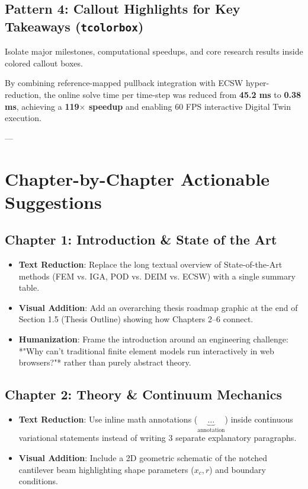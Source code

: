 \documentclass[12pt,a4paper]{article}
\begin{document}
\subsection{Pattern 4: Callout Highlights for Key Takeaways (\texttt{tcolorbox})}
Isolate major milestones, computational speedups, and core research results inside colored callout boxes.

\begin{tcolorbox}[colback=lightbg, colframe=accentcyan, title=\textbf{Key Result: Online Acceleration}, fonttitle=\bfseries]
By combining reference-mapped pullback integration with ECSW hyper-reduction, the online solve time per time-step was reduced from \textbf{45.2 ms} to \textbf{0.38 ms}, achieving a \textbf{119$\times$ speedup} and enabling 60 FPS interactive Digital Twin execution.
\end{tcolorbox}

---

\section{Chapter-by-Chapter Actionable Suggestions}

\subsection{Chapter 1: Introduction \& State of the Art}
\begin{itemize}[leftmargin=*]
    \item \textbf{Text Reduction}: Replace the long textual overview of State-of-the-Art methods (FEM vs. IGA, POD vs. DEIM vs. ECSW) with a single summary table.
    \item \textbf{Visual Addition}: Add an overarching thesis roadmap graphic at the end of Section 1.5 (Thesis Outline) showing how Chapters 2--6 connect.
    \item \textbf{Humanization}: Frame the introduction around an engineering challenge: *"Why can't traditional finite element models run interactively in web browsers?"* rather than purely abstract theory.
\end{itemize}

\subsection{Chapter 2: Theory \& Continuum Mechanics}
\begin{itemize}[leftmargin=*]
    \item \textbf{Text Reduction}: Use inline math annotations ($\underbrace{\dots}_{\text{annotation}}$) inside continuous variational statements instead of writing 3 separate explanatory paragraphs.
    \item \textbf{Visual Addition}: Include a 2D geometric schematic of the notched cantilever beam highlighting shape parameters ($x_c, r$) and boundary conditions.
\end{itemize}
\end{document}
